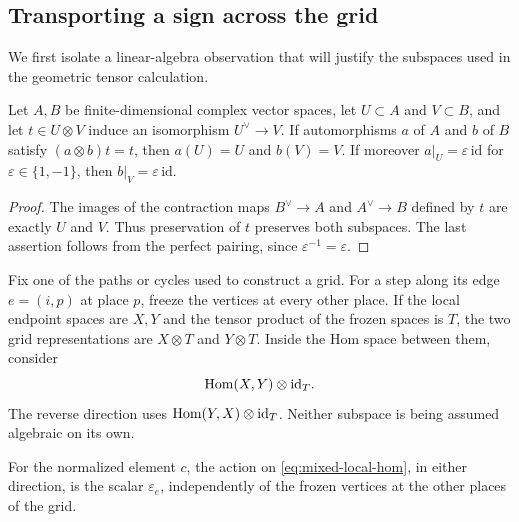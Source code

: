 \subsection{Transporting a sign across the grid}

We first isolate a linear-algebra observation that will justify the
subspaces used in the geometric tensor calculation.

\begin{lemma}\label{lem:mixed-support}
Let $A,B$ be finite-dimensional complex vector spaces, let
$U\subset A$ and $V\subset B$, and let $t\in U\otimes V$ induce
an isomorphism $U^\vee\to V$.  If automorphisms $a$ of $A$ and
$b$ of $B$ satisfy $(a\otimes b)t=t$, then $a(U)=U$ and $b(V)=V$.
If moreover $a|_U=\varepsilon\,\mathrm{id}$ for
$\varepsilon\in\{1,-1\}$, then
$b|_V=\varepsilon\,\mathrm{id}$.
\end{lemma}

\begin{proof}
The images of the contraction maps $B^\vee\to A$ and
$A^\vee\to B$ defined by $t$ are exactly $U$ and $V$.
Thus preservation of $t$ preserves both subspaces.  The last
assertion follows from the perfect pairing, since
$\varepsilon^{-1}=\varepsilon$.
\end{proof}

Fix one of the paths or cycles used to construct a grid.  For a step
along its edge $e=(i,p)$ at place $p$, freeze the vertices at every
other place.  If the local endpoint spaces are $X,Y$ and the tensor
product of the frozen spaces is $T$, the two grid representations are
$X\otimes T$ and $Y\otimes T$.  Inside the Hom space between them,
consider
\begin{equation}\label{eq:mixed-local-hom}
 \operatorname{Hom}(X,Y)\otimes\mathrm{id}_T.
\end{equation}
The reverse direction uses $\operatorname{Hom}(Y,X)\otimes\mathrm{id}_T$.
Neither subspace is being assumed algebraic on its own.

\begin{lemma}\label{lem:mixed-propagation}
For the normalized element $c$, the action on
\eqref{eq:mixed-local-hom}, in either direction, is the scalar
$\varepsilon_e$, independently of the frozen vertices at the
other places of the grid.
\end{lemma}

